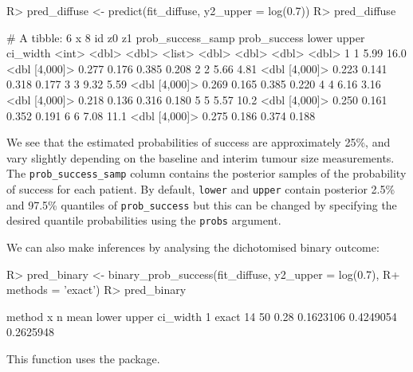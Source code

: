 \documentclass[article]{jss}
\begin{document}
\begin{CodeChunk}

\begin{CodeInput}
R> pred_diffuse <- predict(fit_diffuse, y2_upper = log(0.7))
R> pred_diffuse %
\end{CodeInput}

\begin{CodeOutput}
# A tibble: 6 x 8
     id    z0    z1 prob_success_samp prob_success lower upper ci_width
  <int> <dbl> <dbl> <list>                   <dbl> <dbl> <dbl>    <dbl>
1     1  5.99 16.0  <dbl [4,000]>            0.277 0.176 0.385    0.208
2     2  5.66  4.81 <dbl [4,000]>            0.223 0.141 0.318    0.177
3     3  9.32  5.59 <dbl [4,000]>            0.269 0.165 0.385    0.220
4     4  6.16  3.16 <dbl [4,000]>            0.218 0.136 0.316    0.180
5     5  5.57 10.2  <dbl [4,000]>            0.250 0.161 0.352    0.191
6     6  7.08 11.1  <dbl [4,000]>            0.275 0.186 0.374    0.188
\end{CodeOutput}
\end{CodeChunk}

We see that the estimated probabilities of success are approximately
25\%, and vary slightly depending on the baseline and interim tumour
size measurements. The \texttt{prob\_success\_samp} column contains the
posterior samples of the probability of success for each patient. By
default, \texttt{lower} and \texttt{upper} contain posterior 2.5\% and
97.5\% quantiles of \texttt{prob\_success} but this can be changed by
specifying the desired quantile probabilities using the \texttt{probs}
argument.

We can also make inferences by analysing the dichotomised binary
outcome:

\begin{CodeChunk}

\begin{CodeInput}
R> pred_binary <- binary_prob_success(fit_diffuse, y2_upper = log(0.7), 
R+                                    methods = 'exact')
R> pred_binary
\end{CodeInput}

\begin{CodeOutput}
  method  x  n mean     lower     upper  ci_width
1  exact 14 50 0.28 0.1623106 0.4249054 0.2625948
\end{CodeOutput}
\end{CodeChunk}

This function uses the  \citep{binom} package.
\end{document}
